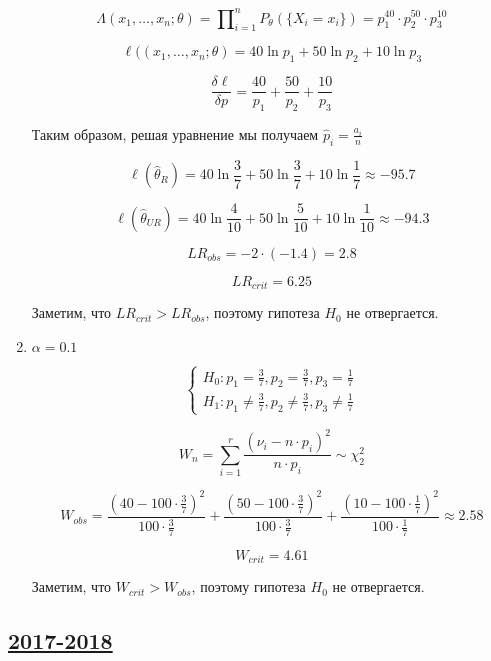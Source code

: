 \begin{enumerate}
\[
\Lambda(x_1, \dots ,x_n;\theta) = \prod\nolimits_{i=1}^n P_\theta (\{X_i = x_i\})= p_1^{40} \cdot p_2^{50} \cdot p_3^{10}
\]

\[
\ell((x_1, \dots ,x_n;\theta)= 40\ln p_1 + 50\ln p_2 + 10\ln p_3
\]

\[
\frac{\delta \ell}{\delta p} = \frac{40}{p_1} + \frac{50}{p_2} + \frac{10}{p_3} 
\]

Таким образом, решая уравнение мы получаем $\hat p_i = \frac{a_i}{n}$

\[
\ell(\hat \theta_R) = 40\ln {\frac{3}{7}} + 50\ln {\frac{3}{7}} + 10\ln {\frac{1}{7}} \approx -95.7
\]

\[
\ell(\hat \theta_{UR}) = 40\ln {\frac{4}{10}} + 50\ln {\frac{5}{10}} + 10\ln {\frac{1}{10}} \approx -94.3
\]

\[
LR_{obs} = -2 \cdot (-1.4) = 2.8
\]

\[
LR_{crit} = 6.25
\]
	
Заметим, что $LR_{crit} > LR_{obs}$, поэтому гипотеза $H_0$ не отвергается.

\item
$\alpha = 0.1$
	
\[
\begin{cases}
H_0: p_1 = \frac{3}{7}, p_2 = \frac{3}{7}, p_3 = \frac{1}{7} \\
H_1: p_1 \neq \frac{3}{7}, p_2 \neq \frac{3}{7}, p_3 \neq \frac{1}{7} 
\end{cases}
\]

\[	
W_n = \sum_{i=1}^r\frac{(\nu_i - n \cdot p_i)^2}{n \cdot p_i}\sim \chi_2^2
\]

\[
W_{obs} = \frac{(40 - 100 \cdot \frac{3}{7})^2}{100 \cdot \frac{3}{7}} + \frac{(50 - 100 \cdot \frac{3}{7})^2}{100 \cdot \frac{3}{7}} + \frac{(10 - 100 \cdot \frac{1}{7})^2}{100 \cdot \frac{1}{7}} \approx 2.58 
\]

\[
W_{crit} = 4.61
\]

Заметим, что $W_{crit} > W_{obs}$, поэтому гипотеза $H_0$ не отвергается.	
\end{enumerate} 


\subsection[2017-2018]{\hyperref[sec:kr_04_2017_2018]{2017-2018}}
\label{sec:sol_kr_04_2017_2018}


